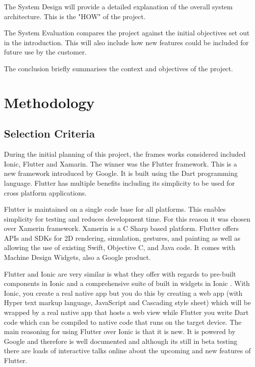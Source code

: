 The System Design will provide a detailed explanation of the overall system architecture. This is the "HOW" of the project.

The System Evaluation compares the project against the initial objectives set out in the introduction. This will also include how new features could be included for future use by the customer.

The conclusion briefly summarises the context and objectives of the project.

\chapter{Methodology}

\section{Selection Criteria}

During the initial planning of this project, the frames works considered included Ionic, Flutter and Xamarin. The winner was the Flutter framework. This is a new framework introduced by Google. It is built using the Dart programming language. Flutter has multiple benefits including its simplicity to be used for cross platform applications.

Flutter is maintained on a single code base for all platforms. This enables simplicity for testing and reduces development time. For this reason it was chosen over Xamerin framework. Xamerin is a C Sharp based platform. Flutter offers APIs and SDKs for 2D rendering, simulation, gestures, and painting as well as allowing the use of existing Swift, Objective C, and Java code. It comes with Machine Design Widgets, also a Google product. \cite{flutterVsXamarin}

Flutter and Ionic are very similar is what they offer with regards to pre-built components in Ionic and a comprehensive suite of built in widgets in Ionic \cite{ReactVsFlutterVsIonic}. With Ionic, you create a real native app but you do this by creating a web app (with Hyper text markup language, JavaScript and Cascading style sheet) which will be wrapped by a real native app that hosts a web view while Flutter you write Dart code which can be compiled to native code that runs on the target device. The main reasoning for using Flutter over Ionic is that it is new. It is powered by Google and therefore is well documented and although its still in beta testing there are loads of interactive talks online about the upcoming and new features of Flutter. 

